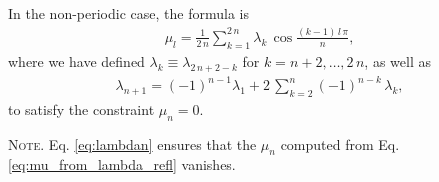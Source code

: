 \documentclass[preprint, floatfix]{revtex4-1}
\newcommand{\note}[1]{{\color{DarkGreen}\footnotesize \textsc{Note.} #1}}
\begin{document}
In the non-periodic case,
the formula is
%
\begin{align}
  \mu_l
  =
  \frac 1 { 2 \, n }
  \sum_{ k = 1 }^{ 2 \, n }
    \lambda_{ k } \,
    \cos \frac{ (k - 1) \, l \, \pi }
              {            n        }
  ,
\label{eq:mu_from_lambda_refl}
\end{align}
%
where
we have defined
$\lambda_k \equiv \lambda_{2 \, n + 2 - k}$
for $k = n + 2, \dots, 2 \, n$,
as well as
%
\begin{align}
  \lambda_{ n + 1 }
  =
  (-1)^{ n - 1 }
  \lambda_1
  +
  2 \, \sum_{ k = 2 }^{ n }
      (-1)^{n - k} \, \lambda_k
  ,
\label{eq:lambdan}
\end{align}
to satisfy the constraint $\mu_n = 0$.
%
\note{Eq. \eqref{eq:lambdan}
  ensures that the $\mu_n$
  computed from Eq. \eqref{eq:mu_from_lambda_refl}
  vanishes.

}
\end{document}
